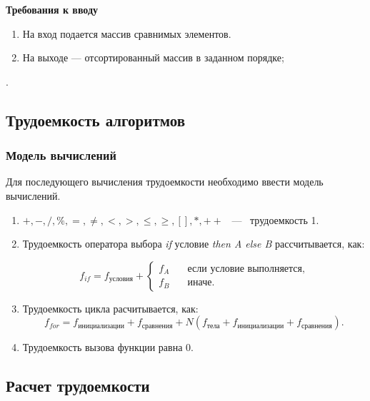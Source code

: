\documentclass[14pt,russian]{scrartcl}
\begin{document}
\textbf{Требования к вводу}
		
\begin{enumerate}
	\item На вход подается массив сравнимых элементов.
	\item На выходе --- отсортированный массив в заданном порядке;
\end{enumerate}.

\subsection{Трудоемкость алгоритмов}

\subsubsection{Модель вычислений}

Для последующего вычисления трудоемкости необходимо ввести модель вычислений.

\begin{enumerate}
    \item $+, -, /, \%, =, \neq, <, >, \leq, \geq, [ ], *, ++$ ~---~ трудоемкость 1.
    \item Трудоемкость оператора выбора \textit{if} условие \textit{then A else B} рассчитывается, как: 
    
    \begin{equation}
        f_{if} = f_{\text{условия}} + \begin{cases}
                                f_A & \quad \text{если условие выполняется,} \\
                                f_B & \quad \text{иначе}.
                                \end{cases}
    \end{equation}

    \item Трудоемкость цикла расчитывается, как:
    \begin{equation}
        f_{for} = f_{\text{инициализации}} + f_{\text{сравнения}} + N(f_{\text{тела}} + f_{\text{инициализации}} + f_{\text{сравнения}}).
    \end{equation}

    \item Трудоемкость вызова функции равна 0.
\end{enumerate}

\subsection{Расчет трудоемкости}
\end{document}
